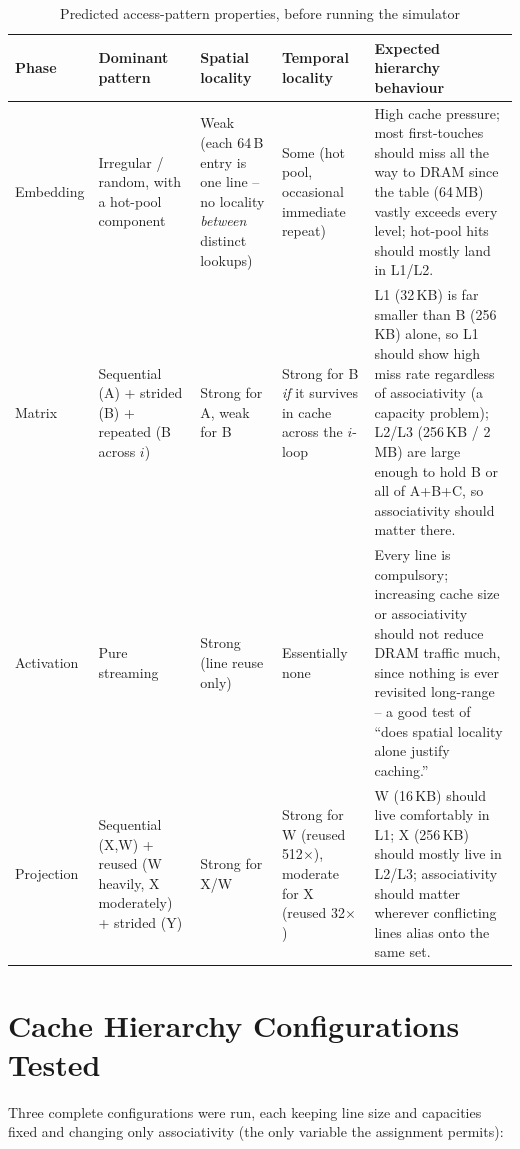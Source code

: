 \documentclass[11pt]{article}
\begin{document}
\begin{table}[H]
\centering
\small
\begin{tabular}{p{2.1cm}p{2.6cm}p{2.6cm}p{3.2cm}p{4.5cm}}
\toprule
Phase & Dominant pattern & Spatial locality & Temporal locality & Expected hierarchy behaviour \\
\midrule
Embedding & Irregular / random, with a hot-pool component & Weak (each 64\,B entry is one line -- no locality \emph{between} distinct lookups) & Some (hot pool, occasional immediate repeat) & High cache pressure; most first-touches should miss all the way to DRAM since the table (64\,MB) vastly exceeds every level; hot-pool hits should mostly land in L1/L2. \\
Matrix & Sequential (A) + strided (B) + repeated (B across $i$) & Strong for A, weak for B & Strong for B \emph{if} it survives in cache across the $i$-loop & L1 (32\,KB) is far smaller than B (256\,KB) alone, so L1 should show high miss rate regardless of associativity (a capacity problem); L2/L3 (256\,KB / 2\,MB) are large enough to hold B or all of A+B+C, so associativity should matter there. \\
Activation & Pure streaming & Strong (line reuse only) & Essentially none & Every line is compulsory; increasing cache size or associativity should not reduce DRAM traffic much, since nothing is ever revisited long-range -- a good test of ``does spatial locality alone justify caching.'' \\
Projection & Sequential (X,W) + reused (W heavily, X moderately) + strided (Y) & Strong for X/W & Strong for W (reused 512$\times$), moderate for X (reused 32$\times$) & W (16\,KB) should live comfortably in L1; X (256\,KB) should mostly live in L2/L3; associativity should matter wherever conflicting lines alias onto the same set. \\
\bottomrule
\end{tabular}
\caption{Predicted access-pattern properties, before running the simulator}
\end{table}

\section{Cache Hierarchy Configurations Tested}
\label{sec:baseline}

Three complete configurations were run, each keeping line size and
capacities fixed and changing only associativity (the only variable the
assignment permits):
\end{document}
